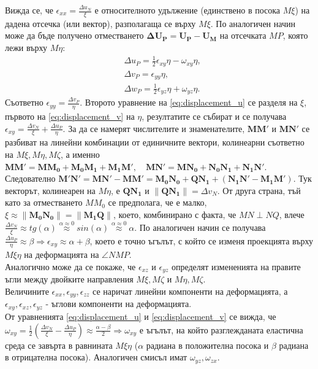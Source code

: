 \documentclass{report}
\begin{document}
	Вижда се, че $\epsilon_{xx}=\frac{\Delta u_N}{\xi}$ е относителното удължение (единствено в посока $M\xi$) на дадена отсечка (или вектор), разполагаща се върху $M\xi$. По аналогичен начин може да бъде получено отместването $\boldsymbol{\Delta U_P}=\boldsymbol{U_P}-\boldsymbol{ U_M}$ на отсечката $MP$, която лежи върху $M\eta$:
	\begin{equation}
		\begin{aligned}
			&\Delta u_P =\frac{1}{2}\epsilon_{xy}\eta-\omega_{xy}\eta,\\
			&\Delta v_P =\epsilon_{yy}\eta,\\
			&\Delta w_P =\frac{1}{2}\epsilon_{yz}\eta+\omega_{yz}\eta.
		\end{aligned}
		\label{eq:displacement_v}
	\end{equation}
	Съответно $\epsilon_{yy}=\frac{\Delta v_P}{\eta}$. Второто уравнение на \ref{eq:displacement_u} се разделя на $\xi$, първото на \ref{eq:displacement_v} на $\eta$, резултатите се събират и се получава $\epsilon_{xy} = \frac{\Delta v_N}{\xi} + \frac{\Delta u_P}{\eta}$. За да се намерят числителите и знаменателите, $\mathbf{MM'}$ и $\mathbf{MN'}$ се разбиват на линейни комбинации от единичните вектори, колинеарни съответно на $M\xi, M\eta, M\zeta$, а именно $\mathbf{MM'}=\mathbf{MM_0}+\mathbf{M_0M_1}+\mathbf{M_1M'},\quad \mathbf{MN'}=\mathbf{MN_0}+\mathbf{N_0N_1}+\mathbf{N_1N'}$. 
	Следователно $\mathbf{M'N'}=\mathbf{MN'}-\mathbf{MM'}=\mathbf{M_0N_0}+\mathbf{QN_1}+(\mathbf{N_1N'}-\mathbf{M_1M}')$. 
	Тук векторът, колинеарен на $M\eta$, е $\mathbf{QN_1}$ и $\|\mathbf{QN_1}\|=\Delta v_N$. 
	От друга страна, тъй като за отместването $MM_0$ се предполага, че е малко, $\xi \approx \|\mathbf{M_0N_0}\| = \|\mathbf{M_1Q}\|$, което, комбинирано с факта, че $MN\perp NQ$, влече $\frac{\Delta v_N}{\xi} \approx tg(\alpha) \overset{\text{$\alpha \approx0$}}{\approx} sin(\alpha) \overset{\text{$\alpha \approx0$}}{\approx} \alpha$. По аналогичен начин се получава $\frac{\Delta u_P}{\eta} \approx \beta \Rightarrow \epsilon_{xy} \approx \alpha + \beta$, което е точно ъгълът, с който се изменя проекцията върху $M\xi\eta$ на деформацията на $\angle NMP$.\\
	
	Аналогично може да се покаже, че $\epsilon_{xz}$ и $ \epsilon_{yz}$ определят измененията на правите ъгли между двойките направления $M\xi, M\zeta$ и $M\eta, M\zeta$.\\
	Величините $\epsilon_{xx}, \epsilon_{yy}, \epsilon_{zz}$ се наричат линейни компоненти на деформацията, а $\epsilon_{xy}, \epsilon_{xz}, \epsilon_{yz}$ - ъглови компоненти на деформацията.\\
	От уравненията \ref{eq:displacement_u} и \ref{eq:displacement_v} се вижда, че $\omega_{xy} = \frac{1}{2}(\frac{\Delta v_N}{\xi}-\frac{\Delta u_P}{\eta}) \approx \frac{\alpha - \beta}{2} \Rightarrow \omega_{xy}$ е ъгълът, на който разглежданата еластична среда се завърта в равнината $M\xi\eta$ ($\alpha$ радиана в положителна посока и $\beta$ радиана в отрицателна посока). Аналогичен смисъл имат $\omega_{yz},\omega_{zx}$.
	
\end{document}
